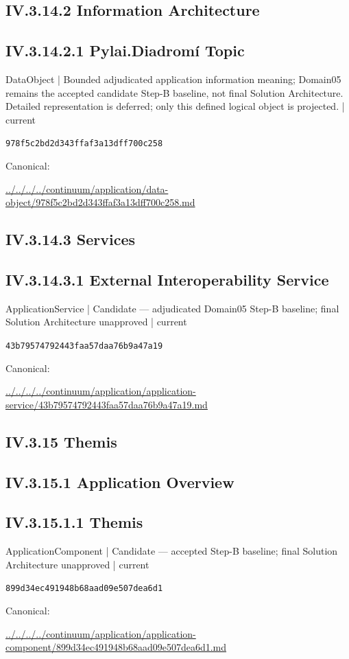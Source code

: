 \documentclass[10pt,a4paper]{article}
\begin{document}
\subsection*{IV.3.14.2 Information Architecture}
\subsection*{IV.3.14.2.1 Pylai.Diadromí Topic}
{\small DataObject | Bounded adjudicated application information meaning; Domain05 remains the accepted candidate Step-B baseline, not final Solution Architecture. Detailed representation is deferred; only this defined logical object is projected. | current}\par
\texttt{978f5c2bd2d343ffaf3a13dff700c258}\par
Canonical: \par
{\footnotesize\url{../../../../continuum/application/data-object/978f5c2bd2d343ffaf3a13dff700c258.md}}\par
\subsection*{IV.3.14.3 Services}
\subsection*{IV.3.14.3.1 External Interoperability Service}
{\small ApplicationService | Candidate — adjudicated Domain05 Step-B baseline; final Solution Architecture unapproved | current}\par
\texttt{43b79574792443faa57daa76b9a47a19}\par
Canonical: \par
{\footnotesize\url{../../../../continuum/application/application-service/43b79574792443faa57daa76b9a47a19.md}}\par
\subsection*{IV.3.15 Themis}
\subsection*{IV.3.15.1 Application Overview}
\subsection*{IV.3.15.1.1 Themis}
{\small ApplicationComponent | Candidate — accepted Step-B baseline; final Solution Architecture unapproved | current}\par
\texttt{899d34ec491948b68aad09e507dea6d1}\par
Canonical: \par
{\footnotesize\url{../../../../continuum/application/application-component/899d34ec491948b68aad09e507dea6d1.md}}\par
\end{document}
